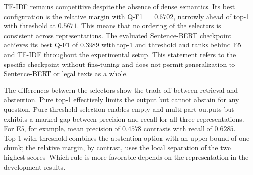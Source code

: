 \documentclass[11pt]{article}
\begin{document}
TF-IDF remains competitive despite the absence of dense semantics. Its best configuration is the relative margin with Q-F1 $=0.5702$, narrowly ahead of top-1 with threshold at $0.5671$. This means that no ordering of the selectors is consistent across representations. The evaluated Sentence-BERT checkpoint achieves its best Q-F1 of $0.3989$ with top-1 and threshold and ranks behind E5 and TF-IDF throughout the experimental setup. This statement refers to the specific checkpoint without fine-tuning and does not permit generalization to Sentence-BERT or legal texts as a whole.

The differences between the selectors show the trade-off between retrieval and abstention. Pure top-1 effectively limits the output but cannot abstain for any question. Pure threshold selection enables empty and multi-part outputs but exhibits a marked gap between precision and recall for all three representations. For E5, for example, mean precision of $0.4578$ contrasts with recall of $0.6285$. Top-1 with threshold combines the abstention option with an upper bound of one chunk; the relative margin, by contrast, uses the local separation of the two highest scores. Which rule is more favorable depends on the representation in the development results.
\end{document}
